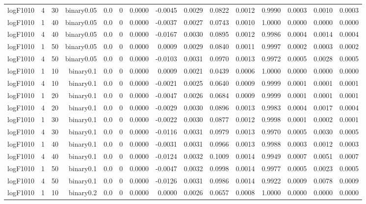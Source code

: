 \begin{longtable}{rrrrrrrrrrrrrrr}
  logF1010 & 4 & 30 & binary0.05 & 0.0 & 0 & 0.0000 & -0.0045 & 0.0029 & 0.0822 & 0.0012 & 0.9990 & 0.0003 & 0.0010 & 0.0003 \\ 
  logF1010 & 1 & 40 & binary0.05 & 0.0 & 0 & 0.0000 & -0.0037 & 0.0027 & 0.0743 & 0.0010 & 1.0000 & 0.0000 & 0.0000 & 0.0000 \\ 
  logF1010 & 4 & 40 & binary0.05 & 0.0 & 0 & 0.0000 & -0.0167 & 0.0030 & 0.0895 & 0.0012 & 0.9986 & 0.0004 & 0.0014 & 0.0004 \\ 
  logF1010 & 1 & 50 & binary0.05 & 0.0 & 0 & 0.0000 & 0.0009 & 0.0029 & 0.0840 & 0.0011 & 0.9997 & 0.0002 & 0.0003 & 0.0002 \\ 
  logF1010 & 4 & 50 & binary0.05 & 0.0 & 0 & 0.0000 & -0.0103 & 0.0031 & 0.0970 & 0.0013 & 0.9972 & 0.0005 & 0.0028 & 0.0005 \\ 
  logF1010 & 1 & 10 & binary0.1 & 0.0 & 0 & 0.0000 & 0.0009 & 0.0021 & 0.0439 & 0.0006 & 1.0000 & 0.0000 & 0.0000 & 0.0000 \\ 
  logF1010 & 4 & 10 & binary0.1 & 0.0 & 0 & 0.0000 & -0.0021 & 0.0025 & 0.0640 & 0.0009 & 0.9999 & 0.0001 & 0.0001 & 0.0001 \\ 
  logF1010 & 1 & 20 & binary0.1 & 0.0 & 0 & 0.0000 & -0.0047 & 0.0026 & 0.0684 & 0.0009 & 0.9999 & 0.0001 & 0.0001 & 0.0001 \\ 
  logF1010 & 4 & 20 & binary0.1 & 0.0 & 0 & 0.0000 & -0.0029 & 0.0030 & 0.0896 & 0.0013 & 0.9983 & 0.0004 & 0.0017 & 0.0004 \\ 
  logF1010 & 1 & 30 & binary0.1 & 0.0 & 0 & 0.0000 & -0.0022 & 0.0030 & 0.0877 & 0.0012 & 0.9998 & 0.0001 & 0.0002 & 0.0001 \\ 
  logF1010 & 4 & 30 & binary0.1 & 0.0 & 0 & 0.0000 & -0.0116 & 0.0031 & 0.0979 & 0.0013 & 0.9970 & 0.0005 & 0.0030 & 0.0005 \\ 
  logF1010 & 1 & 40 & binary0.1 & 0.0 & 0 & 0.0000 & -0.0031 & 0.0031 & 0.0966 & 0.0013 & 0.9988 & 0.0003 & 0.0012 & 0.0003 \\ 
  logF1010 & 4 & 40 & binary0.1 & 0.0 & 0 & 0.0000 & -0.0124 & 0.0032 & 0.1009 & 0.0014 & 0.9949 & 0.0007 & 0.0051 & 0.0007 \\ 
  logF1010 & 1 & 50 & binary0.1 & 0.0 & 0 & 0.0000 & -0.0047 & 0.0032 & 0.0998 & 0.0014 & 0.9977 & 0.0005 & 0.0023 & 0.0005 \\ 
  logF1010 & 4 & 50 & binary0.1 & 0.0 & 0 & 0.0000 & -0.0126 & 0.0031 & 0.0986 & 0.0014 & 0.9922 & 0.0009 & 0.0078 & 0.0009 \\ 
  logF1010 & 1 & 10 & binary0.2 & 0.0 & 0 & 0.0000 & 0.0000 & 0.0026 & 0.0657 & 0.0008 & 1.0000 & 0.0000 & 0.0000 & 0.0000 \\ 

\end{longtable}
